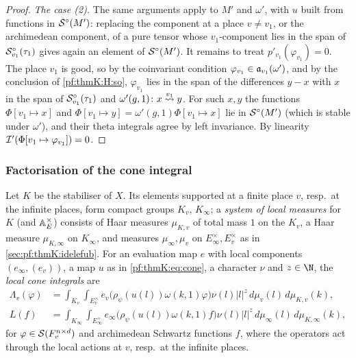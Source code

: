 \begin{proof}
\emph{The case (2).} The same arguments apply to $M'$ and $\omega'$, with $u$ built from functions in $\mathcal{S}^{\circ}(M')$:
replacing the component at a place $v\ne v_1$, or the archimedean component, of a pure tensor whose $v_1$-component lies in
the span of $\mathcal{S}^{\circ}_{v_1}(\tau_1)$ gives again an element of $\mathcal{S}^{\circ}(M')$. It remains to treat $p'_{v_1}(\varphi_{v_1})=0$.
The place $v_1$ is good, so by the coinvariant condition $\varphi_{v_1}\in\mathfrak{a}_{v_1}(\omega')$, and by the conclusion of
\ref{pf:thmK:H:so}, $\varphi_{v_1}$ lies in the span of the differences $y-x$ with $x$ in the span of
$\mathcal{S}^{\circ}_{v_1}(\tau_1)$ and $\omega'(g,1)\colon x\mathrel{\stackrel{v_1}{\leadsto}}y$. For such $x,y$ the functions $\Phi[v_1\mapsto x]$ and
$\Phi[v_1\mapsto y]=\omega'(g,1)\Phi[v_1\mapsto x]$ lie in $\mathcal{S}^{\circ}(M')$ (which is stable under $\omega'$), and their theta
integrals agree by left invariance. By linearity $\mathcal{I}'(\Phi[v_1\mapsto\varphi_{v_1}])=0$.
\end{proof}

\subsubsection{Factorisation of the cone integral}\label{sec:pf:thmK:conefac}
Let $K$ be the stabiliser of $X$. Its elements supported at a finite place $v$, resp.\ at the infinite places, form compact
groups $K_v$, $K_\infty$; a \emph{system of local measures} for $K$ (and $\mathbb{A}_E^\times$) consists of Haar measures
$\mu_{K,v}$ of total mass $1$ on the $K_v$, a Haar measure $\mu_{K,\infty}$ on $K_\infty$, and measures $\mu_\infty,\mu_v$ on
$E_\infty^\times,E_v^\times$ as in \cref{sec:pf:thmK:idelefub}. For an evaluation map $e$ with local components
$(e_\infty,(e_v))$, a map $u$ as in \eqref{pf:thmK:eq:cone}, a character $\nu$ and $z\in\N$, the \emph{local cone integrals}
are
\begin{align*}
\Lambda_v(\varphi)&=\int_{K_v}\int_{E_v^\times}e_v\bigl(\rho_\psi(u(l))\omega(k,1)\varphi\bigr)\nu(l)|l|^z\,d\mu_v(l)\,
d\mu_{K,v}(k),\\
L(f)&=\int_{K_\infty}\int_{E_\infty^\times}e_\infty\bigl(\rho_\psi(u(l))\omega(k,1)f\bigr)\nu(l)|l|^z\,d\mu_\infty(l)\,
d\mu_{K,\infty}(k),
\end{align*}
for $\varphi\in\mathcal{S}(F_v^{n\times d})$ and archimedean Schwartz functions $f$, where the operators act through the local
actions at $v$, resp.\ at the infinite places.

